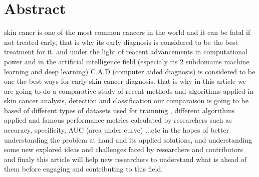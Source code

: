 \section*{Abstract}
skin caner is one of the most common cancers in the world and it can be fatal if not treated early, that is why its early diagnosis is considered to be the best treatment for it. and under the light of reacent advancements in computational power and in the artificial intelligence field (especialy its 2 subdomains machine learning and deep learning) C.A.D (computer aided diagnosis) is considered to be one the best ways for early skin cancer diagnosis. that is why in this article we are going to do a comparative study of recent methods and algorithms applied in skin cancer analysis, detection and classification our comparaison is going to be based of different types of datasets used for trainning , different algorithms applied and famous performance metrics calculated by researchers such as accuracy, specificity, AUC (area under curve) ...etc in the hopes of better understanding the problem at hand and its applied solutions, and understanding some new explored ideas and challenges faced by researchers and contributors and finaly this article will help new researchers to understand what is ahead of them before engaging and contributing to this field.





